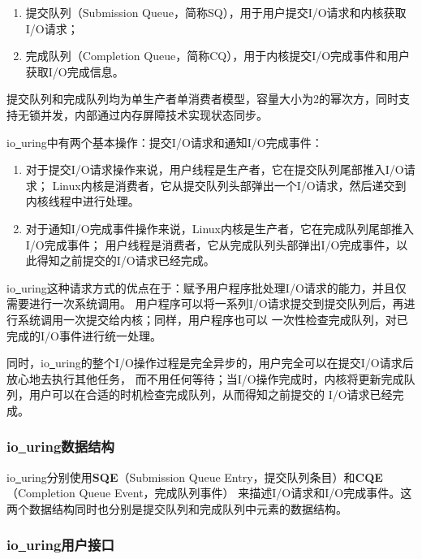 \documentclass[supercite]{HustGraduPaper}
\theoremstyle{definition}
\begin{document}
\begin{enumerate}
  \item 提交队列（Submission Queue，简称SQ），用于用户提交I/O请求和内核获取I/O请求；
  \item 完成队列（Completion Queue，简称CQ），用于内核提交I/O完成事件和用户获取I/O完成信息。
\end{enumerate}

提交队列和完成队列均为单生产者单消费者模型，容量大小为2的幂次方，同时支持无锁并发，内部通过内存屏障技术实现状态同步。\par

io\underline{~}uring中有两个基本操作：提交I/O请求和通知I/O完成事件：
\begin{enumerate}
  \item 对于提交I/O请求操作来说，用户线程是生产者，它在提交队列尾部推入I/O请求；
    Linux内核是消费者，它从提交队列头部弹出一个I/O请求，然后递交到内核线程中进行处理。
  \item 对于通知I/O完成事件操作来说，Linux内核是生产者，它在完成队列尾部推入I/O完成事件；
    用户线程是消费者，它从完成队列头部弹出I/O完成事件，以此得知之前提交的I/O请求已经完成。
\end{enumerate}

io\underline{~}uring这种请求方式的优点在于：赋予用户程序批处理I/O请求的能力，并且仅需要进行一次系统调用。
用户程序可以将一系列I/O请求提交到提交队列后，再进行系统调用一次提交给内核；同样，用户程序也可以
一次性检查完成队列，对已完成的I/O事件进行统一处理。\par

同时，io\underline{~}uring的整个I/O操作过程是完全异步的，用户完全可以在提交I/O请求后放心地去执行其他任务，
而不用任何等待；当I/O操作完成时，内核将更新完成队列，用户可以在合适的时机检查完成队列，从而得知之前提交的
I/O请求已经完成。\par

\subsubsection{io\underline{~}uring数据结构}
io\underline{~}uring分别使用\textbf{SQE}（Submission Queue Entry，提交队列条目）和\textbf{CQE}（Completion Queue Event，完成队列事件）
来描述I/O请求和I/O完成事件。这两个数据结构同时也分别是提交队列和完成队列中元素的数据结构。\par

\subsubsection{io\underline{~}uring用户接口}
\end{document}
